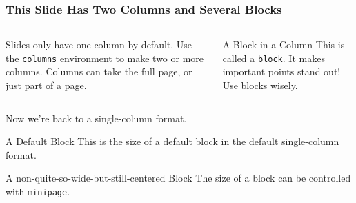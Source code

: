 \documentclass[10pt, aspectratio=169]{oden_beamer}
\begin{document}
\begin{frame} %
\frametitle{This Slide Has Two Columns and Several Blocks}
\begin{columns}
\begin{column}{.49\textwidth}
    Slides only have one column by default.
    Use the \texttt{columns} environment to make two or more columns.
    Columns can take the full page, or just part of a page.
\end{column}
%
\begin{column}{.49\textwidth}
    \begin{block}{A Block in a Column}
        This is called a \texttt{block}.
        It makes important points stand out!
        Use blocks wisely.
    \end{block}
\end{column}
\end{columns}

\vspace{.5cm}
Now we're back to a single-column format.

\pause %

\begin{block}{A Default Block}
     This is the size of a default block in the default single-column format.
\end{block}

\begin{center}
\begin{minipage}{.9\textwidth}
\begin{block}{A non-quite-so-wide-but-still-centered Block}
    The size of a block can be controlled with \texttt{minipage}.
\end{block}
\end{minipage}
\end{center}
\end{frame}

\end{document}

